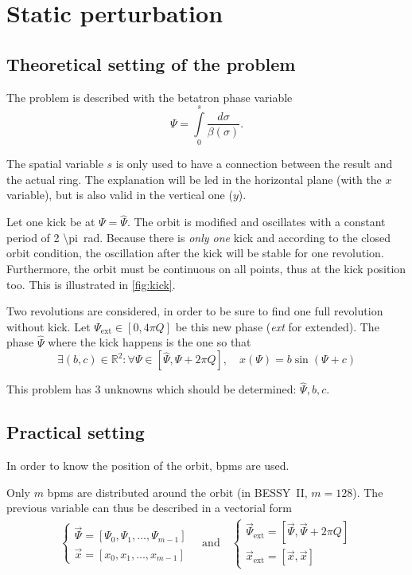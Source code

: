 \section{Static perturbation}
\label{sec:loc_static}

\subsection{Theoretical setting of the problem}

The problem is described with the betatron phase variable 
\begin{equation}
\Psi = \int\limits_{0}^s \frac{d\sigma}{\beta(\sigma)}.
\end{equation}

The spatial variable $s$ is only used to have a connection between the result and the actual ring. The explanation will be led in the horizontal plane (with the $x$ variable), but is also valid in the vertical one ($y$).

Let one kick be at $\Psi = \hat{\Psi}$. The orbit is modified and oscillates with a constant period of \SI{2 \pi}{\radian}. Because there is \emph{only one} kick and according to the closed orbit condition, the oscillation after the kick will be stable for one revolution. Furthermore, the orbit must be continuous on all points, thus at the kick position too. This is illustrated in \cref{fig:kick}.

Two revolutions are considered, in order to be sure to find one full revolution without kick. Let $\Psi_\mathrm{ext} \in [0, 4 \pi Q]$ be this new phase (\textit{ext} for extended). The phase $\hat\Psi$ where the kick happens is the one so that 
\begin{equation}
\exists (b, c) \in \mathbb{R}^2:
\forall \Psi \in [\hat\Psi, \hat\Psi + 2 \pi Q], \quad
x(\Psi) = b \sin(\Psi + c)
\end{equation}

This problem has 3 unknowns which should be determined: $\hat\Psi, b, c$. 

\subsection{Practical setting}
In order to know the position of the orbit, \glspl{bpm} are used.

Only $m$ \glspl{bpm} are distributed around the orbit (in BESSY~II, $m=128$). The previous variable can thus be described in a vectorial form
\begin{align}
\begin{cases}
\vec{\Psi} = [\Psi_0, \Psi_1, ..., \Psi_{m-1}] \\
\vec{x} = [x_0, x_1, ..., x_{m-1}]
\end{cases} \quad \mathrm{and} \quad
\begin{cases}
\vec{\Psi}_\mathrm{ext} = [\vec{\Psi}, \vec{\Psi}+2\pi Q ]\\
\vec{x}_\mathrm{ext} = [\vec{x}, \vec{x}]
\end{cases}
\end{align}


